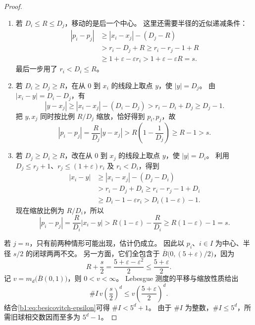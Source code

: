 \begin{proof}
\begin{enumerate}
\item\label{b1:item:besicovitch-case-three}
若 \(D_i\leq R\leq D_j\)，移动的是后一个中心。
这里还需要半径的近似递减条件：
\[
 \begin{aligned}
 |p_i-p_j|
 &\geq |x_i-x_j|-(D_j-R)\\
 &>r_i-D_j+R
 \geq r_i-r_j-1+R\\
 &\geq1+\varepsilon-\varepsilon r_i
 >1+\varepsilon-\varepsilon R
 =s.
 \end{aligned}
\]
最后一步用了 \(r_i<D_i\leq R\)。

\item\label{b1:item:besicovitch-case-four}
若 \(D_i\geq D_j\geq R\)，在从 \(0\) 到 \(x_i\) 的线段上取点 \(y\)，使 \(|y|=D_j\)。
由 \(|x_i-y|=D_i-D_j\)，有
\[
 |y-x_j|
 \geq |x_i-x_j|-(D_i-D_j)
 >r_i-D_i+D_j
 \geq D_j-1.
\]
把 \(y,x_j\) 同时按比例 \(R/D_j\) 缩放，恰好得到 \(p_i,p_j\)，故
\[
 |p_i-p_j|=\frac R{D_j}|y-x_j|
 >R\left(1-\frac1{D_j}\right)
 \geq R-1>s.
\]

\item\label{b1:item:besicovitch-case-five}
若 \(D_j\geq D_i\geq R\)，改在从 \(0\) 到 \(x_j\) 的线段上取点 \(y\)，使 \(|y|=D_i\)。
利用 \(D_j\leq r_j+1\)、\(r_j\leq(1+\varepsilon)r_i\) 及 \(r_i<D_i\)，得到
\[
 \begin{aligned}
 |x_i-y|
 &\geq |x_i-x_j|-(D_j-D_i)\\
 &>r_i-D_j+D_i
 \geq r_i-r_j-1+D_i\\
 &\geq D_i-1-\varepsilon r_i
 >D_i(1-\varepsilon)-1.
 \end{aligned}
\]
现在缩放比例为 \(R/D_i\)，所以
\[
 |p_i-p_j|
 =\frac R{D_i}|x_i-y|
 >R(1-\varepsilon)-\frac R{D_i}
 \geq R(1-\varepsilon)-1=s.
\]
\end{enumerate}

若 \(j=n\)，只有前两种情形可能出现，估计仍成立。
因此以 \(p_i\)、\(i\in I\) 为中心、半径 \(s/2\) 的闭球两两不交。
另一方面，它们全包含于
\(\overline B\bigl(0,(5+\varepsilon)/2\bigr)\)，因为
\[
 R+\frac s2=\frac{5+\varepsilon-\varepsilon^2}{2}
 \leq\frac{5+\varepsilon}{2}.
\]
记 \(v=m_d\bigl(\overline B(0,1)\bigr)\)，则 \(0<v<\infty\)。
Lebesgue 测度的平移与缩放性质给出
\[
 \#I\,v\left(\frac s2\right)^d
 \leq v\left(\frac{5+\varepsilon}{2}\right)^d.
\]
结合\eqref{b1:eq:besicovitch-epsilon}可得 \(\#I<5^d+1\)。
由于 \(\#I\) 为整数，\(\#I\leq5^d\)，所需旧球相交数因而至多为 \(5^d-1\)。
\end{proof}

